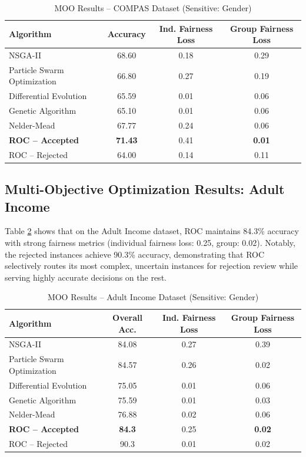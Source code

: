 \documentclass[12pt,a4paper]{article}
\begin{document}
\begin{table}[h]
\centering
\caption{MOO Results -- COMPAS Dataset (Sensitive: Gender)}
\label{tab:moo_compas}
\begin{tabular}{lccc}
\toprule
\textbf{Algorithm} & \textbf{Accuracy} & \textbf{Ind. Fairness Loss} & \textbf{Group Fairness Loss} \\
\midrule
NSGA-II                     & 68.60 & 0.18 & 0.29 \\
Particle Swarm Optimization & 66.80 & 0.27 & 0.19 \\
Differential Evolution      & 65.59 & 0.01 & 0.06 \\
Genetic Algorithm           & 65.10 & 0.01 & 0.06 \\
Nelder-Mead                 & 67.77 & 0.24 & 0.06 \\
\midrule
\textbf{ROC -- Accepted}    & \textbf{71.43} & 0.41 & \textbf{0.01} \\
ROC -- Rejected             & 64.00 & 0.14 & 0.11 \\
\bottomrule
\end{tabular}
\end{table}

\subsection{Multi-Objective Optimization Results: Adult Income}

Table \ref{tab:moo_adult} shows that on the Adult Income dataset, ROC maintains 84.3\% accuracy with strong fairness metrics (individual fairness loss: 0.25, group: 0.02). Notably, the rejected instances achieve 90.3\% accuracy, demonstrating that ROC selectively routes its most complex, uncertain instances for rejection review while serving highly accurate decisions on the rest.

\begin{table}[h]
\centering
\caption{MOO Results -- Adult Income Dataset (Sensitive: Gender)}
\label{tab:moo_adult}
\begin{tabular}{lccc}
\toprule
\textbf{Algorithm} & \textbf{Overall Acc.} & \textbf{Ind. Fairness Loss} & \textbf{Group Fairness Loss} \\
\midrule
NSGA-II                     & 84.08 & 0.27 & 0.39 \\
Particle Swarm Optimization & 84.57 & 0.26 & 0.02 \\
Differential Evolution      & 75.05 & 0.01 & 0.06 \\
Genetic Algorithm           & 75.59 & 0.01 & 0.03 \\
Nelder-Mead                 & 76.88 & 0.02 & 0.06 \\
\midrule
\textbf{ROC -- Accepted}    & \textbf{84.3}  & 0.25 & \textbf{0.02} \\
ROC -- Rejected             & 90.3  & 0.01 & 0.02 \\
\bottomrule
\end{tabular}
\end{table}
\end{document}
